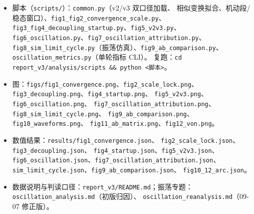\documentclass[11pt,a4paper]{ctexart}
\newcommand{\file}[1]{\texttt{#1}}
\begin{document}
\begin{itemize}
  \item 脚本（\file{scripts/}）：\file{common.py}（v2/v3 双口径加载、
        相似变换拟合、机动段/稳态窗口）、\file{fig1\_fig2\_convergence\_scale.py}、
        \file{fig3\_fig4\_decoupling\_startup.py}、\file{fig5\_v2v3.py}、
        \file{fig6\_oscillation.py}、\file{fig7\_oscillation\_attribution.py}、
        \file{fig8\_sim\_limit\_cycle.py}（振荡仿真）、\file{fig9\_ab\_comparison.py}、
        \file{oscillation\_metrics.py}（单轮指标 CLI）。
        复跑：\texttt{cd report\_v3/analysis/scripts \&\& python <脚本>}。
  \item 图：\file{figs/fig1\_convergence.png}、\file{fig2\_scale\_lock.png}、
        \file{fig3\_decoupling.png}、\file{fig4\_startup.png}、
        \file{fig5\_v2v3.png}、\file{fig6\_oscillation.png}、
        \file{fig7\_oscillation\_attribution.png}、\file{fig8\_sim\_limit\_cycle.png}、
        \file{fig9\_ab\_comparison.png}、\file{fig10\_waveforms.png}、
        \file{fig11\_ab\_matrix.png}、\file{fig12\_von.png}。
  \item 数值结果：\file{results/fig1\_convergence.json}、
        \file{fig2\_scale\_lock.json}、\file{fig3\_decoupling.json}、
        \file{fig4\_startup.json}、\file{fig5\_v2v3.json}、
        \file{fig6\_oscillation.json}、\file{fig7\_oscillation\_attribution.json}、
        \file{sim\_limit\_cycle.json}、\file{fig9\_ab\_comparison.json}、
        \file{fig10\_12\_arc.json}。
  \item 数据说明与判读口径：\file{report\_v3/README.md}；振荡专题：
        \file{oscillation\_analysis.md}（初版归因）、
        \file{oscillation\_reanalysis.md}（09-07 修正版）。
\end{itemize}
\end{document}
